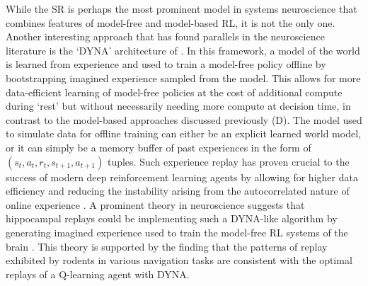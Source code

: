 While the SR is perhaps the most prominent model in systems neuroscience that combines features of model-free and model-based RL, it is not the only one.
Another interesting approach that has found parallels in the neuroscience literature is the `DYNA' architecture of \citet{sutton1991dyna}.
In this framework, a model of the world is learned from experience and used to train a model-free policy offline by bootstrapping imagined experience sampled from the model.
This allows for more data-efficient learning of model-free policies at the cost of additional compute during `rest' but without necessarily needing more compute at decision time, in contrast to the model-based approaches discussed previously (D).
The model used to simulate data for offline training can either be an explicit learned world model, or it can simply be a memory buffer of past experiences in the form of $(s_t, a_t, r_t, s_{t+1}, a_{t+1})$ tuples.
Such experience replay has proven crucial to the success of modern deep reinforcement learning agents by allowing for higher data efficiency and reducing the instability arising from the autocorrelated nature of online experience \citep{mnih2013playing,schaul2015prioritized}.
A prominent theory in neuroscience suggests that hippocampal replays could be implementing such a DYNA-like algorithm by generating imagined experience used to train the model-free RL systems of the brain \citep{mattar2018prioritized}.
This theory is supported by the finding that the patterns of replay exhibited by rodents in various navigation tasks are consistent with the optimal replays of a Q-learning agent with DYNA.
